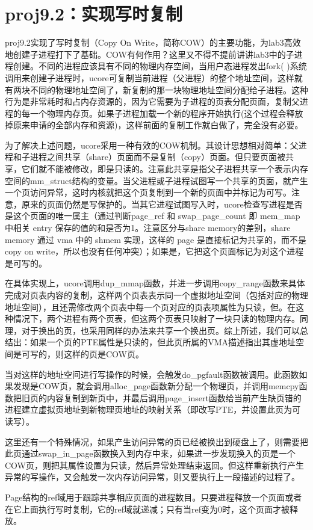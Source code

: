 \section{proj9.2：实现写时复制}\label{proj9.2ux5b9eux73b0ux5199ux65f6ux590dux5236}

proj9.2实现了写时复制（Copy On
Write，简称COW）的主要功能，为lab3高效地创建子进程打下了基础。COW有何作用？这里又不得不提前讲讲lab3中的子进程创建。不同的进程应该具有不同的物理内存空间，当用户态进程发出fork(
)系统调用来创建子进程时，ucore可复制当前进程（父进程）的整个地址空间，这样就有两块不同的物理地址空间了，新复制的那一块物理地址空间分配给子进程。这种行为是非常耗时和占内存资源的，因为它需要为子进程的页表分配页面，复制父进程的每一个物理内存页。如果子进程加载一个新的程序开始执行(这个过程会释放掉原来申请的全部内存和资源)，这样前面的复制工作就白做了，完全没有必要。

为了解决上述问题，ucore采用一种有效的COW机制。其设计思想相对简单：父进程和子进程之间共享（share）页面而不是复制（copy）页面。但只要页面被共享，它们就不能被修改，即是只读的。注意此共享是指父子进程共享一个表示内存空间的mm\_struct结构的变量。当父进程或子进程试图写一个共享的页面，就产生一个页访问异常，这时内核就把这个页复制到一个新的页面中并标记为可写。注意，原来的页面仍然是写保护的。当其它进程试图写入时，ucore检查写进程是否是这个页面的唯一属主（通过判断page\_ref
和 swap\_page\_count 即 mem\_map 中相关 entry
保存的值的和是否为1。注意区分与share memory的差别，share memory 通过 vma
中的 shmem 实现，这样的 page 是直接标记为共享的，而不是 copy on
write，所以也没有任何冲突）；如果是，它把这个页面标记为对这个进程是可写的。

在具体实现上，ucore调用dup\_mmap函数，并进一步调用copy\_range函数来具体完成对页表内容的复制，这样两个页表表示同一个虚拟地址空间（包括对应的物理地址空间），且还需修改两个页表中每一个页对应的页表项属性为只读，但。在这种情况下，两个进程有两个页表，但这两个页表只映射了一块只读的物理内存。同理，对于换出的页，也采用同样的办法来共享一个换出页。综上所述，我们可以总结出：如果一个页的PTE属性是只读的，但此页所属的VMA描述指出其虚地址空间是可写的，则这样的页是COW页。

当对这样的地址空间进行写操作的时候，会触发do\_pgfault函数被调用。此函数如果发现是COW页，就会调用alloc\_page函数新分配一个物理页，并调用memcpy函数把旧页的内容复制到新页中，并最后调用page\_insert函数给当前产生缺页错的进程建立虚拟页地址到新物理页地址的映射关系（即改写PTE，并设置此页为可读写）。

这里还有一个特殊情况，如果产生访问异常的页已经被换出到硬盘上了，则需要把此页通过swap\_in\_page函数换入到内存中来，如果进一步发现换入的页是一个COW页，则把其属性设置为只读，然后异常处理结束返回。但这样重新执行产生异常的写操作，又会触发一次内存访问异常，则又要执行上一段描述的过程了。

Page结构的ref域用于跟踪共享相应页面的进程数目。只要进程释放一个页面或者在它上面执行写时复制，它的ref域就递减；只有当ref变为0时，这个页面才被释放。
